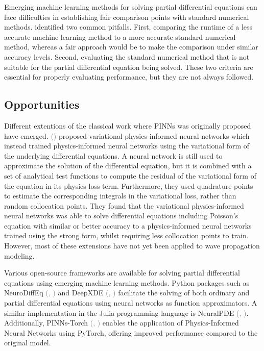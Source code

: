 \documentclass{tufte-handout}
\renewcommand{\citep}[2][]{\textcolor{gray}{(\citeauthor{#2}, \citeyear[#1]{#2})}}
\renewcommand{\citeauthoryear}[2][]{\textcolor{gray}{\citeauthor{#2} (\textcolor{gray}{\citeyear[#1]{#2}})}}
\begin{document}
Emerging machine learning methods for solving partial differential equations can face difficulties in establishing fair comparison points with standard numerical methods. \citeauthor{mcgreivy_weak_2024} identified two common pitfalls. First, comparing the runtime of a less accurate machine learning method to a more accurate standard numerical method, whereas a fair approach would be to make the comparison under similar accuracy levels. Second, evaluating the standard numerical method that is not suitable for the partial differential equation being solved. These two criteria are essential for properly evaluating performance, but they are not always followed. 

\subsection{Opportunities}

Different extentions of the classical work where PINNs was originally proposed have emerged. \citeauthoryear{kharazmi_variational_2019} proposed variational physics-informed neural networks which instead trained physics-informed neural networks using the variational form of the underlying differential equations. A neural network is still used to approximate the solution of the differential equation, but it is combined with a set of analytical test functions to compute the residual of the variational form of the equation in its physics loss term. Furthermore, they used quadrature points to estimate the corresponding integrals in the variational loss, rather than random collocation points. They found that the variational physics-informed neural networks was able to solve differential equations including Poisson’s equation with similar or better accuracy to a physics-informed neural networks trained using the strong form, whilst requiring less collocation points to train. However, most of these extensions have not yet been applied to wave propagation modeling.

Various open-source frameworks are available for solving partial differential equations using emerging machine learning methods. Python packages such as NeuroDiffEq \citep{chen2020neurodiffeq} and DeepXDE \citep{lu2021deepxde} facilitate the solving of both ordinary and partial differential equations using neural networks as function approximators. A similar implementation in the Julia programming language is NeuralPDE \citep{https://doi.org/10.48550/arxiv.2107.09443}. Additionally, PINNs-Torch \citep{bafghi_pinns-torch_2023} enables the application of Physics-Informed Neural Networks using PyTorch, offering improved performance compared to the original model.
\end{document}
